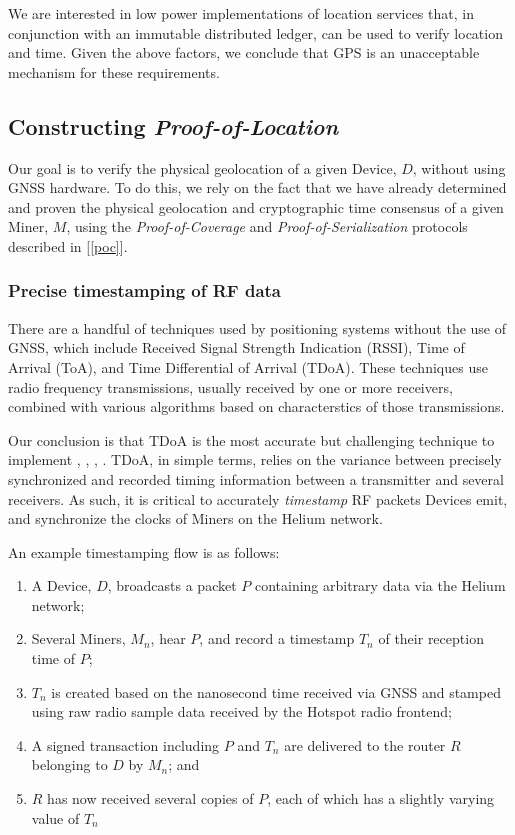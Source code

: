 \documentclass[10pt, nonatbib, nocopyrightspace, reprint]{sigplanconf}
\newcommand{\secref}[1]{[\autoref{#1}]}
\begin{document}
We are interested in low power implementations of location services that, in conjunction with an immutable distributed ledger, can be used to verify location and time. Given the above factors, we conclude that GPS is an unacceptable mechanism for these requirements.

\subsection{Constructing \emph{Proof-of-Location}}

Our goal is to verify the physical geolocation of a given Device, $D$, without using GNSS hardware. To do this, we rely on the fact that we have already determined and proven the physical geolocation and cryptographic time consensus of a given Miner, $M$, using the \emph{Proof-of-Coverage} and \emph{Proof-of-Serialization} protocols described in \secref{poc}.

\subsubsection{Precise timestamping of RF data}

There are a handful of techniques used by positioning systems without the use of GNSS, which include Received Signal Strength Indication (RSSI), Time of Arrival (ToA), and Time Differential of Arrival (TDoA). These techniques use radio frequency transmissions, usually received by one or more receivers, combined with various algorithms based on characterstics of those transmissions.

Our conclusion is that TDoA is the most accurate but challenging technique to implement \cite{tdoavsrssi}, \cite{tdoavstoa}, \cite{wifipositioning}, \cite{locationestimation}. TDoA, in simple terms, relies on the variance between precisely synchronized and recorded timing information between a transmitter and several receivers. As such, it is critical to accurately \emph{timestamp} RF packets Devices emit, and synchronize the clocks of Miners on the Helium network.

An example timestamping flow is as follows:

\begin{enumerate}
  \item A Device, $D$, broadcasts a packet $P$ containing arbitrary data via the Helium network;
  \item Several Miners, $M_n$, hear $P$, and record a timestamp $T_n$ of their reception time of $P$;
  \item $T_n$ is created based on the nanosecond time received via GNSS and stamped using raw radio sample data received by the Hotspot radio frontend;
  \item A signed transaction including $P$ and $T_n$ are delivered to the router $R$ belonging to $D$ by $M_n$; and
  \item $R$ has now received several copies of $P$, each of which has a slightly varying value of $T_n$
\end{enumerate}
\end{document}
